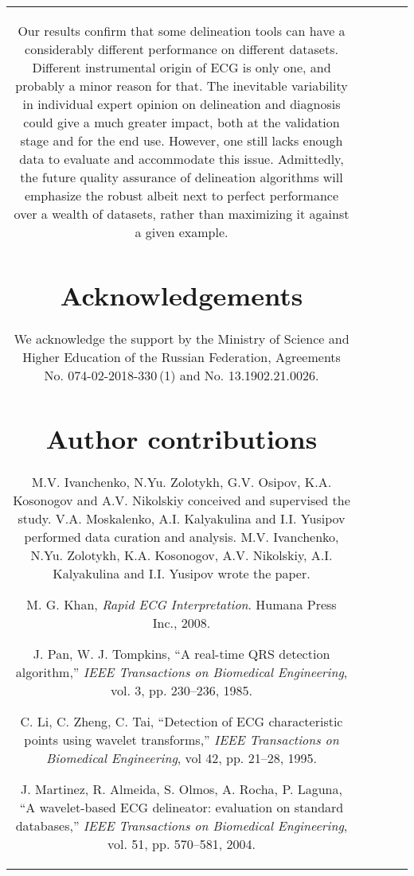 \documentclass[submitted]{ieeeaccess}
\newcommand{\NewCorrection}[1]{{#1}}
\begin{document}
\begin{table}
\begin{tabular}{|c|c|c|c|c|}
 Our results confirm that some delineation tools can have a considerably different performance on different datasets. Different instrumental origin of ECG is only one, and probably a minor reason for that. The inevitable variability in individual expert opinion on delineation and diagnosis could give a much greater impact, both at the validation stage and for the end use. However, one still lacks enough data to evaluate and \NewCorrection{accommodate} this issue. \NewCorrection{Admittedly}, the future quality assurance of delineation algorithms will \NewCorrection{emphasize} the robust albeit next to perfect performance over a wealth of datasets, rather than maximizing it against a given example.



\section*{Acknowledgements}
We acknowledge the support by the Ministry of Science and Higher Education of the Russian Federation, Agreements No. 074-02-2018-330\,(1) and No. 13.1902.21.0026.

\section*{Author contributions}
M.V. Ivanchenko, N.Yu. Zolotykh, G.V. Osipov, K.A. Kosonogov and A.V. Nikolskiy conceived and supervised the study. 
V.A. Moskalenko, A.I. Kalyakulina and I.I. Yusipov performed data curation and analysis. 
M.V. Ivanchenko, N.Yu. Zolotykh, K.A. Kosonogov, A.V. Nikolskiy,  A.I. Kalyakulina and I.I. Yusipov wrote the paper.


\begin{thebibliography}{99}
	
	






	\bibitem{Khan2009}
	M. G. Khan,
	\emph{{R}apid ECG Interpretation}.
	Humana Press Inc., 2008.
	
	\bibitem{Pan1985}
	J. Pan, W. J. Tompkins,
	``{A} real-time QRS detection algorithm,''
	\emph{IEEE Transactions on Biomedical Engineering},
    vol. 3, pp. 230--236, 1985.
	
	\bibitem{Li1995}
	C. Li, C. Zheng, C. Tai,
	``{D}etection of ECG characteristic points using wavelet transforms,'' 
	\emph{IEEE Transactions on Biomedical Engineering},
    vol 42, pp. 21--28, 1995.
	
	\bibitem{Martinez2004}
	J. Martinez, R. Almeida, S. Olmos, A. Rocha, P. Laguna,
	``{A} wavelet-based ECG delineator: evaluation on standard databases,''
	\emph{IEEE Transactions on Biomedical Engineering},
    vol. 51, pp. 570--581, 2004.
    

\end{thebibliography}
\end{tabular}
\end{table}
\end{document}
